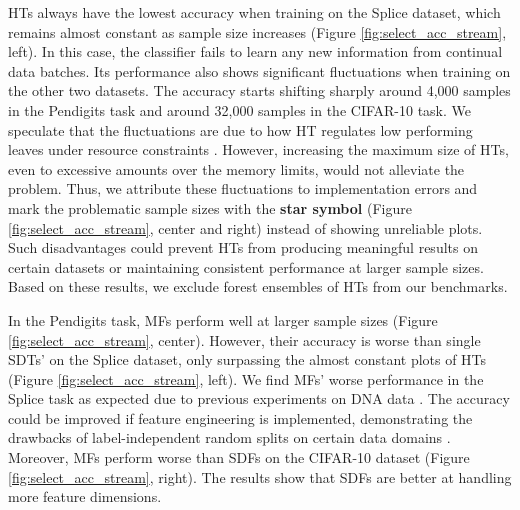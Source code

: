 HTs always have the lowest accuracy when training on the Splice dataset, which remains almost constant as sample size increases (Figure \ref{fig:select_acc_stream}, left). In this case, the classifier fails to learn any new information from continual data batches.
Its performance also shows significant fluctuations when training on the other two datasets. 
The accuracy starts shifting sharply around 4,000 samples in the Pendigits task and around 32,000 samples in the CIFAR-10 task. 
We speculate that the fluctuations are due to how HT regulates low performing leaves under resource constraints \citep{domingos_mining_2000}. However, increasing the maximum size of HTs, even to excessive amounts over the memory limits, would not alleviate the problem. 
Thus, we attribute these fluctuations to implementation errors and mark the problematic sample sizes with the \textbf{star symbol} (Figure \ref{fig:select_acc_stream}, center and right) instead of showing unreliable plots.
Such disadvantages could prevent HTs from producing meaningful results on certain datasets or maintaining consistent performance at larger sample sizes. Based on these results, we exclude forest ensembles of HTs from our benchmarks.

In the Pendigits task, MFs perform well at larger sample sizes (Figure \ref{fig:select_acc_stream}, center). However, their accuracy is worse than single SDTs' on the Splice dataset, only surpassing the almost constant plots of HTs (Figure \ref{fig:select_acc_stream}, left). 
We find MFs' worse performance in the Splice task as expected due to previous experiments on DNA data \citep{lakshminarayanan_mondrian_2014}. 
The accuracy could be improved if feature engineering is implemented, demonstrating the drawbacks of label-independent random splits on certain data domains \citep{roy_mondrian_2009, ziegler_mining_2014}.
Moreover, MFs perform worse than SDFs on the CIFAR-10 dataset (Figure \ref{fig:select_acc_stream}, right). The results show that SDFs are better at handling more feature dimensions.

